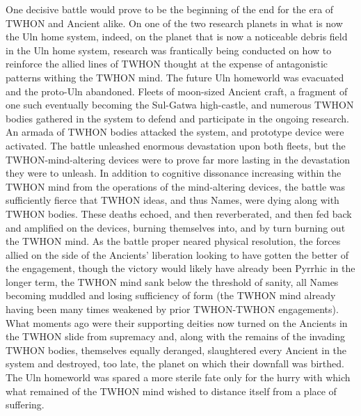 One decisive battle would prove to be the beginning of the end for the
era of TWHON and Ancient alike. On one of the two research planets in
what is now the Uln home system, indeed, on the planet that is now a
noticeable debris field in the Uln home system, research was
frantically being conducted on how to reinforce the allied lines of
TWHON thought at the expense of antagonistic patterns withing the
TWHON mind. The future Uln homeworld was evacuated and the proto-Uln
abandoned. Fleets of moon-sized Ancient craft, a fragment of one such
eventually becoming the Sul-Gatwa high-castle, and numerous TWHON
bodies gathered in the system to defend and participate in the ongoing
research. An armada of TWHON bodies attacked the system, and prototype
device were activated. The battle unleashed enormous devastation upon
both fleets, but the TWHON-mind-altering devices were to prove far
more lasting in the devastation they were to unleash. In addition to
cognitive dissonance increasing within the TWHON mind from the
operations of the mind-altering devices, the battle was sufficiently
fierce that TWHON ideas, and thus Names, were dying along with TWHON
bodies. These deaths echoed, and then reverberated, and then fed back
and amplified on the devices, burning themselves into, and by turn
burning out the TWHON mind. As the battle proper neared physical
resolution, the forces allied on the side of the Ancients' liberation
looking to have gotten the better of the engagement, though the
victory would likely have already been Pyrrhic in the longer term, the
TWHON mind sank below the threshold of sanity, all Names becoming
muddled and losing sufficiency of form (the TWHON mind already having
been many times weakened by prior TWHON-TWHON engagements). What
moments ago were their supporting deities now turned on the Ancients
in the TWHON slide from supremacy and, along with the remains of the
invading TWHON bodies, themselves equally deranged, slaughtered every
Ancient in the system and destroyed, too late, the planet on which
their downfall was birthed. The Uln homeworld was spared a more
sterile fate only for the hurry with which what remained of the TWHON
mind wished to distance itself from a place of suffering.

